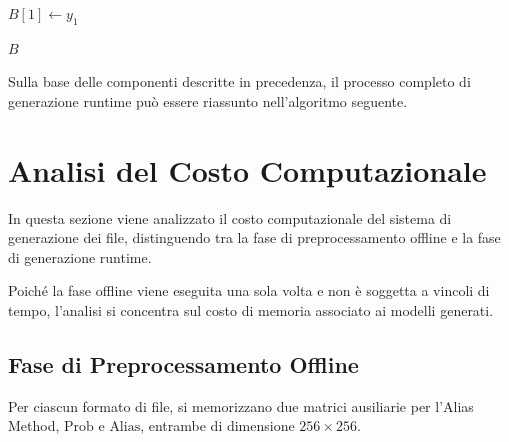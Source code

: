 \documentclass{report}
\begin{document}
\begin{algorithm}[H]
\caption{MarkovGenerate}

$B[1] \gets y_1$\;


\Return $B$\;
\end{algorithm}

\bigskip

Sulla base delle componenti descritte in precedenza, il processo
completo di generazione runtime può essere riassunto
nell’algoritmo seguente.

\bigskip

\begin{algorithm}[H]
\caption{GenerateFiles}
\end{algorithm}


\section{Analisi del Costo Computazionale}

In questa sezione viene analizzato il costo computazionale del sistema di
generazione dei file, distinguendo tra la fase di preprocessamento
offline e la fase di generazione runtime.

\bigskip

Poiché la fase offline viene eseguita una sola volta e non è soggetta a vincoli
di tempo, l’analisi si concentra sul costo di memoria
associato ai modelli generati.


\subsection{Fase di Preprocessamento Offline}

Per ciascun formato di file, si memorizzano due matrici ausiliarie per l’Alias Method, $\text{Prob}$ e $\text{Alias}$,
entrambe di dimensione $256 \times 256$.
\end{document}
